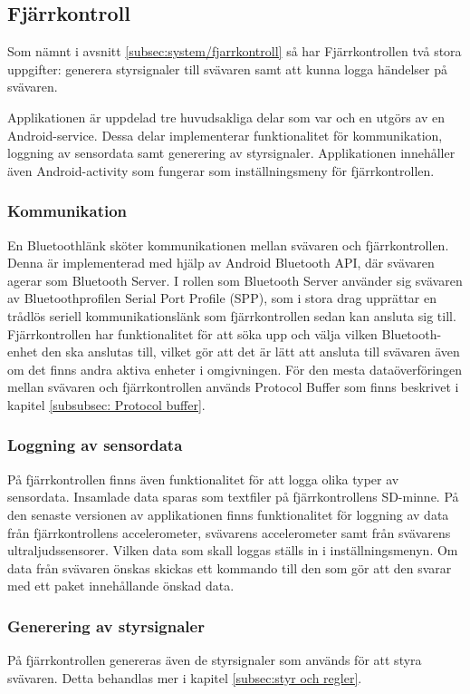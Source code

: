 \subsection{Fjärrkontroll}
Som nämnt i avsnitt \ref{subsec:system/fjarrkontroll} så har Fjärrkontrollen två
stora uppgifter: generera styrsignaler till svävaren samt att kunna logga
händelser på svävaren.

Applikationen är uppdelad tre huvudsakliga delar som var och en utgörs av en
Android-service. Dessa delar implementerar funktionalitet för kommunikation,
loggning av sensordata samt generering av styrsignaler. Applikationen innehåller
även Android-activity som fungerar som inställningsmeny för fjärrkontrollen.

\subsubsection{Kommunikation}
En Bluetoothlänk sköter kommunikationen mellan svävaren och fjärrkontrollen.
Denna är implementerad med hjälp av Android Bluetooth API, där svävaren agerar
som Bluetooth Server. I rollen som Bluetooth Server använder sig svävaren av
Bluetoothprofilen Serial Port Profile (SPP), som i stora drag upprättar en
trådlös seriell kommunikationslänk som fjärrkontrollen sedan kan ansluta sig
till.
Fjärrkontrollen har funktionalitet för att söka upp och välja vilken
Bluetooth-enhet den ska anslutas till, vilket gör att det är lätt att ansluta
till svävaren även om det finns andra aktiva enheter i omgivningen.
För den mesta dataöverföringen mellan svävaren och fjärrkontrollen används
Protocol Buffer som finns beskrivet i kapitel \ref{subsubsec: Protocol buffer}.

\subsubsection{Loggning av sensordata}
På fjärrkontrollen finns även funktionalitet för att logga olika typer av sensordata. Insamlade data sparas som textfiler på fjärrkontrollens SD-minne. 
På den senaste versionen av applikationen finns funktionalitet för loggning av data från fjärrkontrollens accelerometer, svävarens accelerometer samt från svävarens ultraljudssensorer. Vilken data som skall loggas ställs in i inställningsmenyn. Om data från svävaren önskas skickas ett kommando till den som gör att den svarar med ett paket innehållande önskad data. 

\subsubsection{Generering av styrsignaler}
På fjärrkontrollen genereras även de styrsignaler som används för att styra
svävaren. Detta behandlas mer i kapitel \ref{subsec:styr och regler}.

